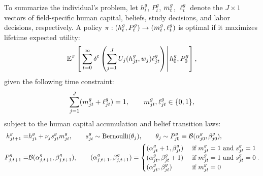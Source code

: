 To summarize the individual's problem, let $h_t^g$, $P_t^g$, $m_t^g$, $\ell_t^g$ denote the $J \times 1$ vectors of field-specific human capital, beliefs, study decisions, and labor decisions, respectively.
A policy $\pi: (h_{t}^g, P_{t}^g) \to (m_{t}^g, \ell_t^g)$ is optimal if it maximizes lifetime expected utility: 
\begin{equation}
    \mathbb{E}^\pi \left[\left. 
        \sum_{t=0}^\infty \delta^t 
        \left( \sum_{j=1}^J U_j(h_{jt}^g, w_j) \ell_{jt}^g \right)
     \right\vert h_{0}^g, P_0^g \right],
\end{equation}
given the following time constraint: 
\begin{equation*}
    \sum_{j=1}^J (m_{jt}^g + \ell_{jt}^g) = 1, 
    \quad \quad 
    m_{jt}^g, \ell_{jt}^g \in \{0,1\},
\end{equation*}
subject to the human capital accumulation and belief transition laws:
\begin{align*}
    h_{jt+1}^g =& h_{jt}^g + \nu_j s_{jt}^g  m_{jt}^g, 
    \quad \quad 
    s_{jt}^g \sim \text{Bernoulli} (\theta_j), 
    \quad \quad
    \theta_{j} \sim P_{j0}^g \equiv \mathcal{B} (\alpha_{j0}^g, \beta_{j0}^g),
    \\
    P_{j,t+1}^g =& \mathcal{B} (\alpha_{j,t+1}^g, \beta_{j,t+1}^g), 
    \quad \quad 
    (\alpha_{j,t+1}^g, \beta_{j,t+1}^g) = 
    \begin{cases} 
        (\alpha_{jt}^g + 1, \beta_{jt}^g) &\text{ if } m_{jt}^g = 1 \text{ and } s_{jt}^g = 1 \\
        (\alpha_{jt}^g, \beta_{jt}^g + 1) &\text{ if } m_{jt}^g = 1 \text{ and } s_{jt}^g = 0 \\
        (\alpha_{jt}^g, \beta_{jt}^g) &\text{ if } m_{jt}^g = 0
    \end{cases}
    .
\end{align*}

